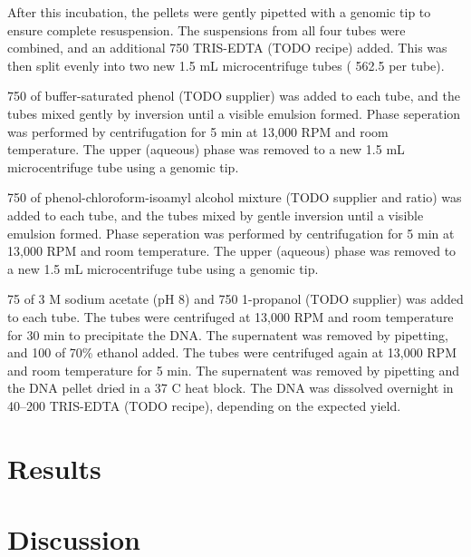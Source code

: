 After this incubation, the pellets were gently pipetted with a genomic tip to ensure complete resuspension.
The suspensions from all four tubes were combined, and an additional 750 \microlitre{} TRIS-EDTA (TODO recipe) added.
This was then split evenly into two new 1.5 mL microcentrifuge tubes (\textapprox{} 562.5 \microlitre{} per tube).

750 \microlitre{} of buffer-saturated phenol (TODO supplier) was added to each tube, and the tubes mixed gently by inversion until a visible emulsion formed.
Phase seperation was performed by centrifugation for 5 min at 13,000 RPM and room temperature.
The upper (aqueous) phase was removed to a new 1.5 mL microcentrifuge tube using a genomic tip.

750 \microlitre{} of phenol-chloroform-isoamyl alcohol mixture (TODO supplier and ratio) was added to each tube, and the tubes mixed by gentle inversion until a visible emulsion formed.
Phase seperation was performed by centrifugation for 5 min at 13,000 RPM and room temperature.
The upper (aqueous) phase was removed to a new 1.5 mL microcentrifuge tube using a genomic tip.

75 \microlitre{} of 3 M sodium acetate (pH 8) and 750 \microlitre{} 1-propanol (TODO supplier) was added to each tube.
The tubes were centrifuged at 13,000 RPM and room temperature for 30 min to precipitate the DNA.
The supernatent was removed by pipetting, and 100 \microlitre{} of 70\% ethanol added.
The tubes were centrifuged again at 13,000 RPM and room temperature for 5 min.
The supernatent was removed by pipetting and the DNA pellet dried in a 37 \textdegrees{}C heat block.
The DNA was dissolved overnight in 40--200 \microlitre{} TRIS-EDTA (TODO recipe), depending on the expected yield.

\section{Results}

\section{Discussion}
